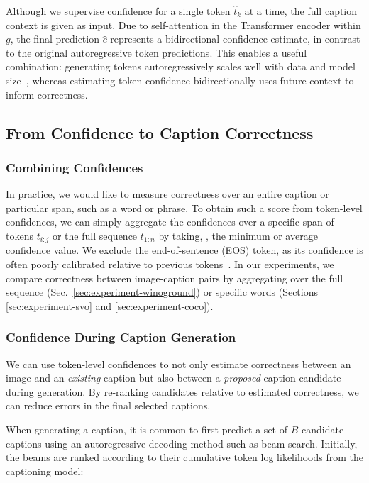 \documentclass[10pt,twocolumn,letterpaper]{article}
\newcommand{\secref}[1]{Sec.\xspace~\ref{#1}}
\newcommand{\minisection}[1]{\noindent{\textbf{#1.}}}
\begin{document}
\minisection{A bidirectional confidence} Although we supervise confidence for a single token $\hat t_k$ at a time, the full caption context is given as input. Due to self-attention in the Transformer encoder within $g$, the final prediction $\hat c$ represents a bidirectional confidence estimate, in contrast to the original autoregressive token predictions. This enables a useful combination: generating tokens autoregressively scales well with data and model size~\cite{ofa,chen2022pali}, whereas estimating token confidence bidirectionally uses future context to inform correctness.


\subsection{From Confidence to Caption Correctness}
\label{sec:method-using-confidences}

\subsubsection{Combining Confidences}
\label{sec:method-combining}

In practice, we would like to measure correctness over an entire caption or particular span, such as a word or phrase. To obtain such a score from token-level confidences, we can simply aggregate the confidences over a specific span of tokens $t_{i:j}$ or the full sequence $t_{1:n}$ by taking, \eg, the minimum or average confidence value. We exclude the end-of-sentence (EOS) token, as its confidence is often poorly calibrated relative to previous tokens~\cite{kumar2019calibration}. In our experiments, we compare correctness between image-caption pairs by aggregating over the full sequence (\secref{sec:experiment-winoground}) or specific words (Sections \ref{sec:experiment-svo} and \ref{sec:experiment-coco}).

\subsubsection{Confidence During Caption Generation}
\label{sec:method-reducing-hallucinations}

We can use token-level confidences to not only estimate correctness between an image and an \textit{existing} caption but also between a \textit{proposed} caption candidate during generation. By re-ranking candidates relative to estimated correctness, we can reduce errors in the final selected captions.

When generating a caption, it is common to first predict a set of $B$ candidate captions using an autoregressive decoding method such as beam search. Initially, the beams are ranked according to their cumulative token log likelihoods from the captioning model:
\end{document}
